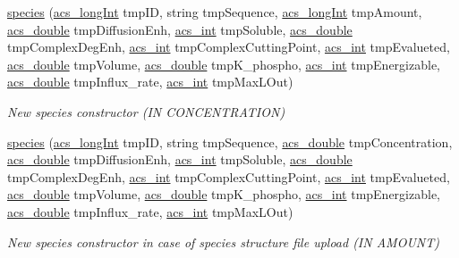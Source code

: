 \begin{DoxyCompactItemize}
\hyperlink{a00022_a2c407091ff53f0d508b7b9ed8230eee4}{species} (\hyperlink{a00050_a19319d75f02db4308bc5c0026d98cd85}{acs\-\_\-long\-Int} tmp\-I\-D, string tmp\-Sequence, \hyperlink{a00050_a19319d75f02db4308bc5c0026d98cd85}{acs\-\_\-long\-Int} tmp\-Amount, \hyperlink{a00050_ab776853a005fcbf56af0424a2a4dd607}{acs\-\_\-double} tmp\-Diffusion\-Enh, \hyperlink{a00050_a8d277355641a098190360234e2ebde35}{acs\-\_\-int} tmp\-Soluble, \hyperlink{a00050_ab776853a005fcbf56af0424a2a4dd607}{acs\-\_\-double} tmp\-Complex\-Deg\-Enh, \hyperlink{a00050_a8d277355641a098190360234e2ebde35}{acs\-\_\-int} tmp\-Complex\-Cutting\-Point, \hyperlink{a00050_a8d277355641a098190360234e2ebde35}{acs\-\_\-int} tmp\-Evalueted, \hyperlink{a00050_ab776853a005fcbf56af0424a2a4dd607}{acs\-\_\-double} tmp\-Volume, \hyperlink{a00050_ab776853a005fcbf56af0424a2a4dd607}{acs\-\_\-double} tmp\-K\-\_\-phospho, \hyperlink{a00050_a8d277355641a098190360234e2ebde35}{acs\-\_\-int} tmp\-Energizable, \hyperlink{a00050_ab776853a005fcbf56af0424a2a4dd607}{acs\-\_\-double} tmp\-Influx\-\_\-rate, \hyperlink{a00050_a8d277355641a098190360234e2ebde35}{acs\-\_\-int} tmp\-Max\-L\-Out)
\begin{DoxyCompactList}\small\item\em New species constructor (I\-N C\-O\-N\-C\-E\-N\-T\-R\-A\-T\-I\-O\-N) \end{DoxyCompactList}\item 
\hyperlink{a00022_a0c91a8b735cb484bff240ba5049f6af3}{species} (\hyperlink{a00050_a19319d75f02db4308bc5c0026d98cd85}{acs\-\_\-long\-Int} tmp\-I\-D, string tmp\-Sequence, \hyperlink{a00050_ab776853a005fcbf56af0424a2a4dd607}{acs\-\_\-double} tmp\-Concentration, \hyperlink{a00050_ab776853a005fcbf56af0424a2a4dd607}{acs\-\_\-double} tmp\-Diffusion\-Enh, \hyperlink{a00050_a8d277355641a098190360234e2ebde35}{acs\-\_\-int} tmp\-Soluble, \hyperlink{a00050_ab776853a005fcbf56af0424a2a4dd607}{acs\-\_\-double} tmp\-Complex\-Deg\-Enh, \hyperlink{a00050_a8d277355641a098190360234e2ebde35}{acs\-\_\-int} tmp\-Complex\-Cutting\-Point, \hyperlink{a00050_a8d277355641a098190360234e2ebde35}{acs\-\_\-int} tmp\-Evalueted, \hyperlink{a00050_ab776853a005fcbf56af0424a2a4dd607}{acs\-\_\-double} tmp\-Volume, \hyperlink{a00050_ab776853a005fcbf56af0424a2a4dd607}{acs\-\_\-double} tmp\-K\-\_\-phospho, \hyperlink{a00050_a8d277355641a098190360234e2ebde35}{acs\-\_\-int} tmp\-Energizable, \hyperlink{a00050_ab776853a005fcbf56af0424a2a4dd607}{acs\-\_\-double} tmp\-Influx\-\_\-rate, \hyperlink{a00050_a8d277355641a098190360234e2ebde35}{acs\-\_\-int} tmp\-Max\-L\-Out)
\begin{DoxyCompactList}\small\item\em New species constructor in case of species structure file upload (I\-N A\-M\-O\-U\-N\-T) \end{DoxyCompactList}\item 

\end{DoxyCompactItemize}
